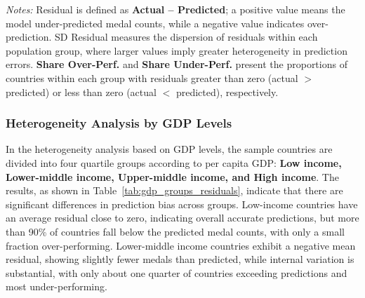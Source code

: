 \documentclass[11pt,twoside]{article}
\numberwithin{Theorem}{section}
\numberwithin{Definition}{section}
\numberwithin{Lemma}{section}
\numberwithin{Algorithm}{section}
\numberwithin{equation}{section}
\begin{document}
\begin{table}[htbp]
\centering
\caption{Prediction residuals by population-size groups}
\label{tab:POP_groups_residuals}
\par\vspace{6pt}
\begin{minipage}{0.95\linewidth}
\footnotesize
\raggedright
\textit{Notes:} Residual is defined as \textbf{Actual -- Predicted}; a positive value means the model under-predicted medal counts, while a negative value indicates over-prediction. 
SD Residual measures the dispersion of residuals within each population group, where larger values imply greater heterogeneity in prediction errors. 
\textbf{Share Over-Perf.} and \textbf{Share Under-Perf.} present the proportions of countries within each group with residuals greater than zero (actual $>$ predicted) or less than zero (actual $<$ predicted), respectively.
\end{minipage}
\end{table}


\subsubsection{Heterogeneity Analysis by GDP Levels}

In the heterogeneity analysis based on GDP levels, the sample countries are divided into four quartile groups according to per capita GDP: \textbf{Low income, Lower-middle income, Upper-middle income, and High income}. The results, as shown in Table~\ref{tab:gdp_groups_residuals}, indicate that there are significant differences in prediction bias across groups. Low-income countries have an average residual close to zero, indicating overall accurate predictions, but more than 90\% of countries fall below the predicted medal counts, with only a small fraction over-performing. Lower-middle income countries exhibit a negative mean residual, showing slightly fewer medals than predicted, while internal variation is substantial, with only about one quarter of countries exceeding predictions and most under-performing.  
\end{document}

